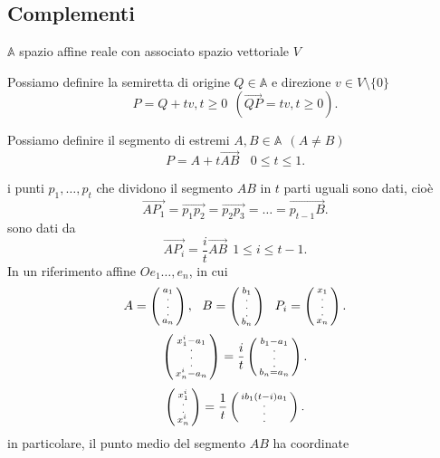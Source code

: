 \documentclass[12px]{article}
\begin{document}
\subsection{Complementi}
	$ \mathbb{A} $ spazio affine reale con associato spazio vettoriale $V$\\
	\begin{defi}[Semiretta]
		Possiamo definire la semiretta di origine $Q\in \mathbb{A} $ e direzione $v\in V\setminus \{0\}$
		\[
		P = Q + tv, t\geq 0\ \ (\overrightarrow{QP} = tv, t\geq 0)
		.\] 
	\end{defi}
	\begin{defi}[Segmento]
		Possiamo definire il segmento di estremi $A, B\in \mathbb{A} \ \ (A\neq B) $
		\[
		P = A + t \overrightarrow{AB} \ \ \ \ 0\leq t\leq 1
		.\] 	
	\end{defi}
	i punti $p_1,\ldots,p_t$ che dividono il segmento $AB$ in $t$ parti uguali sono dati, cioè
\[
	\overrightarrow{AP_1} = \overrightarrow{p_1p_2} = \overrightarrow{p_2p_3} = \ldots = \overrightarrow{p_{t-1}B}
.\] 
sono dati da \[
	\overrightarrow{AP_i} = \frac{i}{t}\overrightarrow{AB} \ \ 1 \leq i\leq t-1
.\] 
	In un riferimento affine $Oe_1\ldots,e_n$, in cui
	\[
		A = \icol{a_1\\ . \\.\\.\\ a_n}, \ \ B = \icol{b_1\\ .\\.\\.\\b_n} \ \ P_i = \icol{x_1\\.\\.\\.\\ x_n}
	.\] 
	\[
		\left(\begin{smallmatrix}x_1^i - a_1\\.\\.\\.\\x_n^i - a_n\end{smallmatrix}\right) = \frac{i}{t}\left(\begin{smallmatrix}b_1-a_1\\.\\.\\.\\ b_n = a_n\end{smallmatrix}\right)
	.\] 
	\[
		\left(\begin{smallmatrix}x_1^i\\.\\.\\x_n^i\end{smallmatrix}\right) = \frac{1}{t}\left(\begin{smallmatrix}ib_1 (t - i)a_1\\.\\.\\.\end{smallmatrix}\right)
	.\] 
	in particolare, il punto medio del segmento $AB$ ha coordinate
\end{document}
